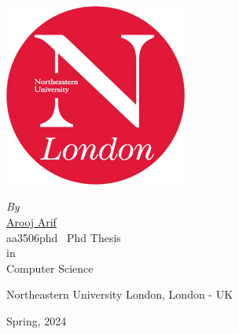 
\begin{center}

\LARGE {}

\end{center}

\begin{center}
	\includegraphics[width=6cm]{nu_logo.jpeg}
\end{center}
\begin{center}
\emph{\large By}\\

\Large {\href{https://scholar.google.com/citations?hl=en&user=ZEwBUxwAAAAJ&view_op=list_works&authuser=1&gmla=AILGF5XqzU9IqXxSuitd8SwCxQWSLHy9OoSQ59cgiyOt3Pi35gv5n8bJg_gLqFhg9SZZv2U2fvQ7DMDOmR6oiGnT5TQkhZ-vwzUvrJNRPEY2m2XMukSMolIK07cvFv6HJGZ6fEN2UhAmB9NIRd1pNy95LBWH7vzvwukF9plB9Ag}{\color{blue} Arooj Arif}}\\
\Large aa3506phd\
\vfill
\Large Phd Thesis\\
\Large in\\
\Large Computer Science
\end{center}
\vfill

\begin{center}
\Large Northeastern University London, London - UK
\end{center}

\begin{center}
\LARGE Spring, 2024
\end{center} 
\thispagestyle{empty}